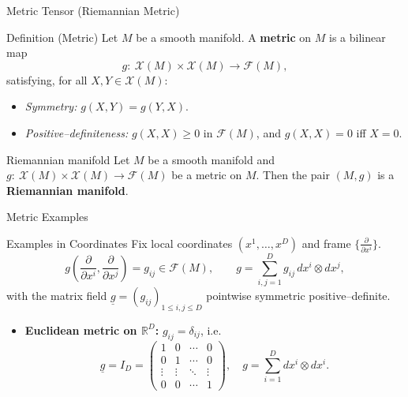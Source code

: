 \begin{frame}{Metric Tensor (Riemannian Metric)}
\begin{block}{Definition (Metric)}
Let $M$ be a smooth manifold. A \textbf{metric} on $M$ is a bilinear map
\[
g:\ \mathcal{X}(M)\times\mathcal{X}(M)\longrightarrow\mathcal{F}(M),
\]
satisfying, for all $X,Y\in\mathcal{X}(M)$:
\begin{itemize}
  \item \textit{Symmetry: } $g(X,Y)=g(Y,X)$.
  \item \textit{Positive–definiteness: } $g(X,X)\ge 0$ in $\mathcal{F}(M)$, and $g(X,X)=0$ iff $X=0$.
\end{itemize}
\end{block}

\begin{block}{Riemannian manifold}
Let $M$ be a smooth manifold and $g:\ \mathcal{X}(M)\times\mathcal{X}(M)\longrightarrow\mathcal{F}(M)$ be a metric on $M$. Then the pair $(M,g)$ is a \textbf{Riemannian manifold}.
\end{block}

\end{frame}



\begin{frame}{Metric Examples}
    \begin{block}{Examples in Coordinates}
Fix local coordinates $(x^1,\dots,x^D)$ and frame $\bigl\{\frac{\partial}{\partial x^i}\bigr\}$.
\[
g\!\left(\frac{\partial}{\partial x^i},\frac{\partial}{\partial x^j}\right)=g_{ij}\in\mathcal{F}(M),
\qquad
g=\sum_{i,j=1}^{D} g_{ij}\,dx^i\otimes dx^j,
\]
with the matrix field $\underline{g}=(g_{ij})_{1\le i,j\le D}$ pointwise symmetric positive–definite.
\begin{itemize}
\item \textbf{Euclidean metric on $\mathbb{R}^D$: } $g_{ij}=\delta_{ij}$, i.e.
\[
\underline{g}=I_D=
\begin{pmatrix}
1 & 0 & \cdots & 0\\
0 & 1 & \cdots & 0\\
\vdots & \vdots & \ddots & \vdots\\
0 & 0 & \cdots & 1
\end{pmatrix},
\quad
g=\sum_{i=1}^D dx^i\otimes dx^i.
\]
\end{itemize}
\end{block}
\end{frame}

